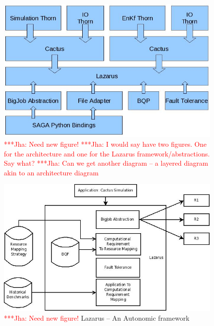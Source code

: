 \documentclass[conference,final]{IEEEtran}
\newcommand{\jhanote}[1]{ {\textcolor{red} { ***Jha: #1 }}}
\begin{document}
\begin{figure}
\begin{center}
\includegraphics[scale=0.34]{./figures/Figure2.jpeg}
\end{center}
\caption{\jhanote{Need new figure!}  \jhanote{I would say have two
    figures. One for the architecture and one for the Lazarus
    framework/abstractions. Say what?}  \jhanote{Can we get another
    diagram -- a layered diagram akin to an architecture diagram}}
\label{fig:application_architecture}
\end{figure}


\begin{figure}
\begin{center}
\includegraphics[scale=0.34]{./figures/Lazarus_01.jpeg}
\end{center}
\caption{\jhanote{Need new figure!}  Lazarus -- An Autonomic
  framework}

\label{fig:application_architecture}
\end{figure}
\end{document}
